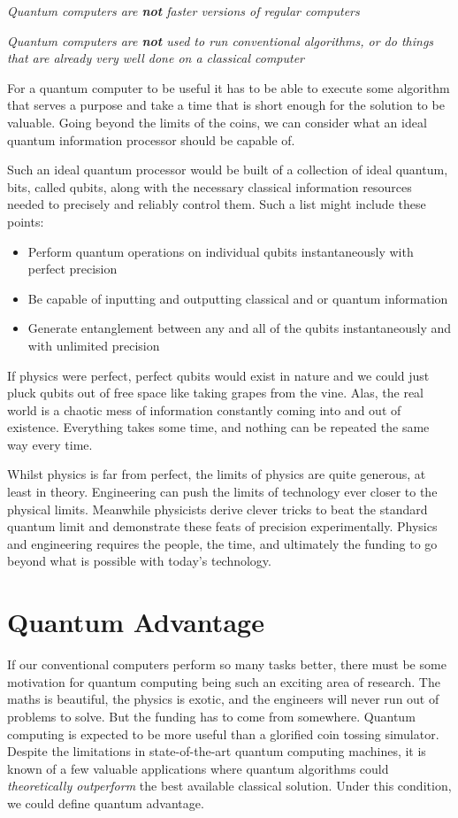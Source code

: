 \documentclass{book}
\begin{document}
\emph{Quantum computers are \textbf{not} faster versions of regular computers}

\emph{ Quantum computers are \textbf{not} used to run conventional algorithms, or do things that are already very well done on a classical computer }

For a quantum computer to be useful it has to be able to execute some algorithm that serves a purpose and take a time that is short enough for the solution to be valuable. Going beyond the limits of the coins, we can consider what an ideal quantum information processor should be capable of. 

Such an ideal quantum processor would be built of a collection of ideal quantum, bits, called qubits, along with the necessary classical information resources needed to precisely and reliably control them. Such a list might include these points:

\begin{itemize}
\item Perform quantum operations on individual qubits instantaneously with perfect precision
\item Be capable of inputting and outputting classical and or quantum information
\item Generate entanglement between any and all of the qubits instantaneously and with unlimited precision 
\end{itemize}

If physics were perfect, perfect qubits would exist in nature and we could just pluck qubits out of free space like taking grapes from the vine. Alas, the real world is a chaotic mess of information constantly coming into and out of existence. Everything takes some time, and nothing can be repeated the same way every time. 

Whilst physics is far from perfect, the limits of physics are quite generous, at least in theory. Engineering can push the limits of technology ever closer to the physical limits. Meanwhile physicists derive clever tricks to beat the standard quantum limit and demonstrate these feats of precision experimentally. Physics and engineering requires the people, the time, and ultimately the funding to go beyond what is possible with today's technology. 

\section{Quantum Advantage} 

If our conventional computers perform so many tasks better, there must be some motivation for quantum computing being such an exciting area of research. The maths is beautiful, the physics is exotic, and the engineers will never run out of problems to solve. But the funding has to come from somewhere. Quantum computing is expected to be more useful than a glorified coin tossing simulator. Despite the limitations in state-of-the-art quantum computing machines, it is known of a few valuable applications where quantum algorithms could \textit{theoretically outperform} the best available classical solution. Under this condition, we could define quantum advantage. 
\end{document}
